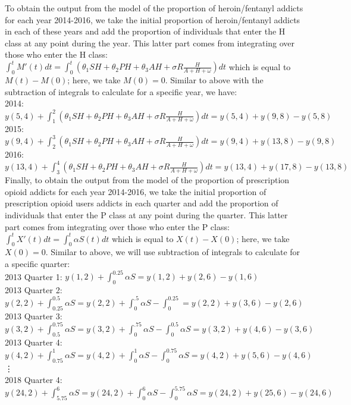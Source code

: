 \documentclass[12pt]{article}
\begin{document}
To obtain the output from the model of the proportion of heroin/fentanyl addicts for each year 2014-2016, we take the initial proportion of heroin/fentanyl addicts in each of these years and add the proportion of individuals that enter the H class at any point during the year. This latter part comes from integrating over those who enter the H class: $\int_0^t M'(t)dt=\int_0^t (\theta_1 SH+\theta_2 PH+\theta_3 AH +\sigma R \frac{H}{A+H+\omega})dt$ which is equal to $M(t)-M(0)$; here, we take $M(0)=0.$ Similar to above with the subtraction of integrals to calculate for a specific year, we have: \\
 2014: $y(5,4)+\int_1^2  (\theta_1 SH+\theta_2 PH+\theta_3 AH +\sigma R \frac{H}{A+H+\omega}) dt= y(5,4)+y(9,8)-y(5,8)$ \\
 2015: $y(9,4)+\int_2^3  (\theta_1 SH+\theta_2 PH+\theta_3 AH +\sigma R \frac{H}{A+H+\omega}) dt= y(9,4)+y(13,8)-y(9,8)$ \\
 2016: $y(13,4)+\int_3^4  (\theta_1 SH+\theta_2 PH+\theta_3 AH +\sigma R \frac{H}{A+H+\omega}) dt= y(13,4)+y(17,8)-y(13,8)$ \\




Finally, to obtain the output from the model of the proportion of prescription opioid addicts for each year 2014-2016, we take the initial proportion of prescription opioid users addicts in each quarter and add the proportion of individuals that enter the P class at any point during the quarter. This latter part comes from integrating over those who enter the P class: $\int_0^t X'(t)dt=\int_0^t \alpha S(t)dt$ which is equal to $X(t)-X(0)$; here, we take $X(0)=0.$ Similar to above, we will use subtraction of integrals to calculate for a specific quarter: \\
 2013 Quarter 1: $y(1,2)+\int_0^{0.25} \alpha S= y(1,2)+y(2,6)-y(1,6)$ \\
 2013 Quarter 2: $y(2,2)+\int_{0.25}^{0.5} \alpha S =y(2,2)+\int_0^{.5} \alpha S- \int_0^{0.25} =y(2,2)+y(3,6)-y(2,6)$ \\
 2013 Quarter 3: $y(3,2)+\int_{0.5}^{0.75} \alpha S =y(3,2)+\int_0^{.75} \alpha S- \int_0^{0.5} \alpha S=y(3,2)+y(4,6)-y(3,6)$ \\
  2013 Quarter 4: $y(4,2)+\int_{0.75}^{1} \alpha S =y(4,2)+\int_0^{1} \alpha S- \int_0^{0.75} \alpha S=y(4,2)+y(5,6)-y(4,6)$ \\
 \vdots \\
  2018 Quarter 4: $y(24,2)+\int_{5.75}^{6} \alpha S =y(24,2)+\int_0^{6} \alpha S- \int_0^{5.75} \alpha S=y(24,2)+y(25,6)-y(24,6)$ \\
\end{document}
